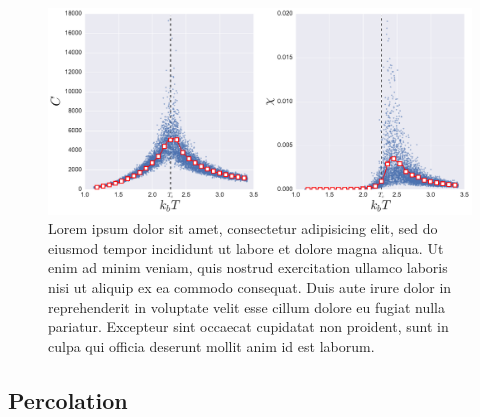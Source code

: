\begin{figure}
\begin{center}
    \includegraphics[width=\textwidth]{chapters/ch2-crit/figs/ising_cx}
\end{center}
\caption{Lorem ipsum dolor sit amet, consectetur adipisicing elit, sed do
    eiusmod tempor incididunt ut labore et dolore magna aliqua. Ut enim ad
    minim veniam, quis nostrud exercitation ullamco laboris nisi ut aliquip ex
    ea commodo consequat. Duis aute irure dolor in reprehenderit in voluptate
    velit esse cillum dolore eu fugiat nulla pariatur. Excepteur sint occaecat
    cupidatat non proident, sunt in culpa qui officia deserunt mollit anim id
    est laborum.}
\label{fig:ising_cx}
\end{figure}



\subsection{Percolation}
\label{sec:perc}

